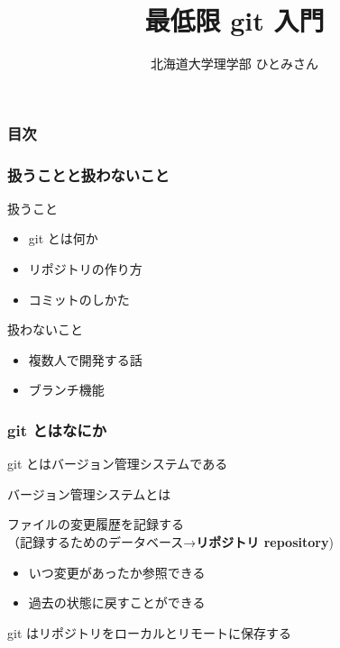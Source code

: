 
\newcommand{\centeralign}[1]{\rule{0pt}{0pt}\hfill#1\hfill\rule{0pt}{0pt}}
\newcommand{\typecommand}[1]{\colorbox{darkgray}{{\ttfamily\color{lime}#1}}}

\setlength{\parskip}{2ex}

\title{最低限 git 入門}
\author{北海道大学理学部 ひとみさん}
\date{\warekitoday}



\frame{\maketitle}

\begin{frame}
	\frametitle{目次}
	\setlength{\parskip}{0.5ex}
	\tableofcontents
\end{frame}

\begin{frame}
	\frametitle{扱うことと扱わないこと}
	\begin{block}{扱うこと}
		\begin{itemize}
			\item git とは何か
			\item リポジトリの作り方
			\item コミットのしかた
		\end{itemize}
	\end{block}
	\begin{block}{扱わないこと}
		\begin{itemize}
			\item 複数人で開発する話
			\item ブランチ機能
		\end{itemize}
	\end{block}
\end{frame}

\begin{frame}
	\frametitle{git とはなにか}

	git とはバージョン管理システムである

	\begin{block}{バージョン管理システムとは}

		ファイルの変更履歴を記録する\\
		（記録するためのデータベース→\textbf{リポジトリ repository})

		\begin{itemize}
			\item いつ変更があったか参照できる
			\item 過去の状態に戻すことができる
		\end{itemize}
	\end{block}

	git はリポジトリをローカルとリモートに保存する
\end{frame}

